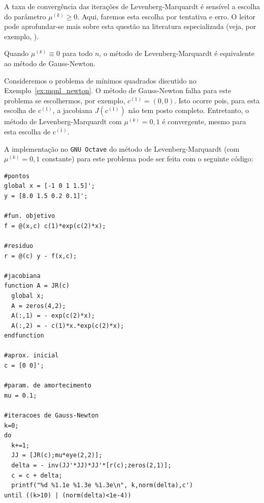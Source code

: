 A taxa de convergência das iterações de Levenberg-Marquardt é sensível a escolha do parâmetro $\mu^{(k)}\geq 0$. Aqui, faremos esta escolha por tentativa e erro. O leitor pode aprofundar-se mais sobre esta questão na literatura especializada (veja, por exemplo, \cite{Bjorck1996a,Nocedal2006a}).

\begin{obs}
  Quando $\mu^{(k)} \equiv 0$ para todo $n$, o método de Levenberg-Marquardt é equivalente ao método de Gauss-Newton.
\end{obs}

\begin{ex}\label{ex:mqnl_LM}
  Consideremos o problema de mínimos quadrados discutido no Exemplo~\ref{ex:mqnl_newton}. O método de Gauss-Newton falha para este problema se escolhermos, por exemplo, $c^{(1)} = (0, 0)$. Isto ocorre pois, para esta escolha de $c^{(1)}$, a jacobiana $J(c^{(1)})$ não tem posto completo. Entretanto, o método de Levenberg-Marquardt com $\mu^{(k)} = 0,1$ é convergente, mesmo para esta escolha de $c^{(1)}$.

\ifisoctave
A implementação no \verb+GNU Octave+ do método de Levenberg-Marquardt (com $\mu^{(k)}=0,1$ constante) para este problema pode ser feita com o seguinte código:
\begin{verbatim}
#pontos
global x = [-1 0 1 1.5]';
y = [8.0 1.5 0.2 0.1]';

#fun. objetivo
f = @(x,c) c(1)*exp(c(2)*x);

#residuo
r = @(c) y - f(x,c);

#jacobiana
function A = JR(c)
  global x;
  A = zeros(4,2);
  A(:,1) = - exp(c(2)*x);
  A(:,2) = - c(1)*x.*exp(c(2)*x);
endfunction

#aprox. inicial
c = [0 0]';

#param. de amortecimento
mu = 0.1;

#iteracoes de Gauss-Newton
k=0;
do
  k+=1;
  JJ = [JR(c);mu*eye(2,2)];
  delta = - inv(JJ'*JJ)*JJ'*[r(c);zeros(2,1)];
  c = c + delta;
  printf("%d %1.1e %1.3e %1.3e\n", k,norm(delta),c')
until ((k>10) | (norm(delta)<1e-4))
\end{verbatim}
\fi
\end{ex}


\emconstrucao
